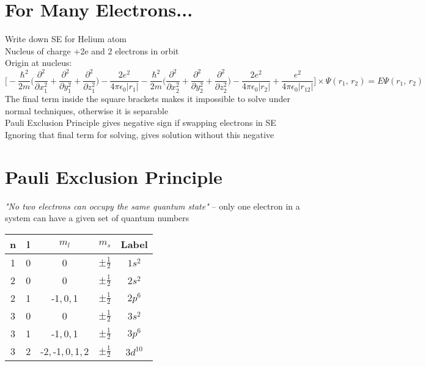 \documentclass[a4paper, 11pt, fleqn, normalem]{report}
\begin{document}
\section{For Many Electrons...}
Write down SE for Helium atom \\
Nucleus of charge +2e and 2 electrons in orbit \\
Origin at nucleus:
\begin{equation*}
    \Bigg[-\frac{\hbar^{2}}{2m}\Big(\frac{\partial^{2}}{\partial x_{1}^{2}} + \frac{\partial^{2}}{\partial y_{1}^{2}} + \frac{\partial^{2}}{\partial z_{1}^{2}}\Big) - \frac{2e^{2}}{4\pi\epsilon_{0}|r_{1}|} - \frac{\hbar^{2}}{2m}\Big(\frac{\partial^{2}}{\partial x_{2}^{2}} + \frac{\partial^{2}}{\partial y_{2}^{2}} + \frac{\partial^{2}}{\partial z_{2}^{2}}\Big) - \frac{2e^{2}}{4\pi\epsilon_{0}|r_{2}|} + \frac{e^{2}}{4\pi\epsilon_{0}|r_{12}|}\Bigg] \times \Psi(r_{1},\,r_{2}) = E\Psi(r_{1},\,r_{2})
\end{equation*}
The final term inside the square brackets makes it impossible to solve under normal techniques, otherwise it is separable \\
Pauli Exclusion Principle gives negative sign if swapping electrons in SE \\
Ignoring that final term for solving, gives solution without this negative

\section{Pauli Exclusion Principle}
\emph{"No two electrons can occupy the same quantum state"} -- only one electron in a system can have a given set of quantum numbers
\begin{table}[H]
    \begin{tabular}{c|ccc|c}
        n & l & $m_{l}$ & $m_{s}$ & Label \\
        \hline
        1 & 0 & 0 & $\pm \frac{1}{2}$ & $1s^{2}$ \\
        2 & 0 & 0 & $\pm \frac{1}{2}$ & $2s^{2}$ \\
        2 & 1 & -1,\,0,\,1 & $\pm \frac{1}{2}$ & $2p^{6}$ \\
        3 & 0 & 0 & $\pm \frac{1}{2}$ & $3s^{2}$ \\
        3 & 1 & -1,\,0,\,1 & $\pm \frac{1}{2}$ & $3p^{6}$ \\
        3 & 2 & -2,\,-1,\,0,\,1,\,2 & $\pm \frac{1}{2}$ & $3d^{10}$
    \end{tabular}
\end{table}
\end{document}
